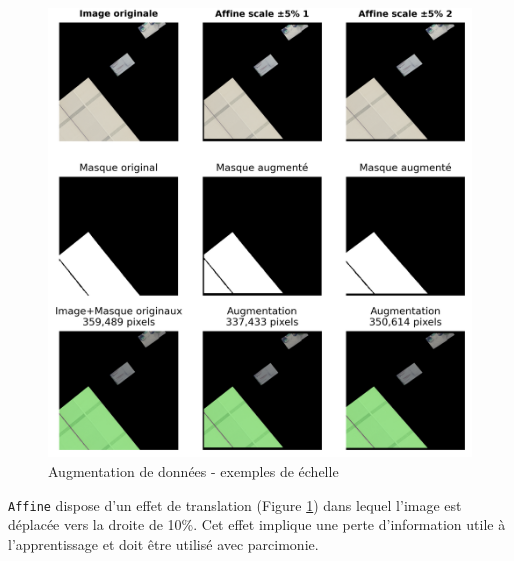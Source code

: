 \begin{figure}[H]
    \centering
    \includegraphics[width=1\linewidth]{02-main/figures/ch3/ch36_augmentations_02_scale.png}
    \caption{Augmentation de données - exemples de échelle}
    \label{fig:ch36_augmentations_02_scale}
\end{figure}

\newpage
\texttt{Affine} dispose d'un effet de translation (Figure \ref{fig:ch36_augmentations_02_scale}) dans lequel l'image est déplacée vers la droite de 10\%. Cet effet implique une perte d'information utile à l'apprentissage et doit être utilisé avec parcimonie.

